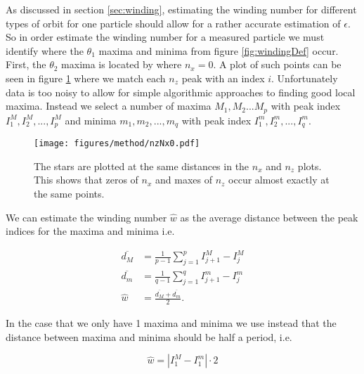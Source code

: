 \label{sec:windingEstimation}
As discussed in section \ref{sec:winding}, estimating the winding number for different types of orbit for one particle 
should allow for a rather accurate estimation of $\epsilon$. So in order estimate the winding number for a measured 
particle we must identify where the $\theta_1$ maxima and minima from figure \ref{fig:windingDef} occur. First, the 
$\theta_2$ maxima is located by where $n_x = 0$. A plot of such 
points can be seen in figure \ref{fig:nzNx0} where we match each $n_z$ peak with an index $i$. Unfortunately data is 
too noisy to allow for simple algorithmic approaches 
to finding good local maxima. Instead we select a number of maxima $M_1, M_2 ... M_p$ with peak index $I^M_1, I^M_2, 
..., I^M_p$  and minima $m_1, m_2, ..., m_q$ with peak index $I^m_1, I^m_2, ..., I^m_q$.

\begin{figure}
\centering
\texttt{[image: figures/method/nzNx0.pdf]}
\caption{The stars are plotted at the same distances in the $n_x$ and $n_z$ plots. This shows that zeros of $n_x$ and maxes of $n_z$ occur almost exactly at the same points.}
\label{fig:nzNx0}
\end{figure}

We can estimate the winding number $\hat{w}$ as the average distance between the peak indices for the maxima and minima 
i.e. 

\begin{align}
\overline{d_M} &= \frac{1}{p-1} \sum\limits_{j=1}^{p} I^M_{j+1} - I^M_{j} \\
\overline{d_m} &= \frac{1}{q-1} \sum\limits_{j=1}^{q} I^m_{j+1}- I^m_{j}\\
\hat{w}   &= \frac{\overline{d_M} + \overline{d_m}}{2}.
\label{eq:winding2}
\end{align}


In the case that we only have 1 maxima and minima we use instead that the distance between maxima and minima should be 
half a period, i.e.

\begin{equation}
\hat{w} = \left| I^M_1 - I^m_1 \right| \cdot 2
\end{equation}